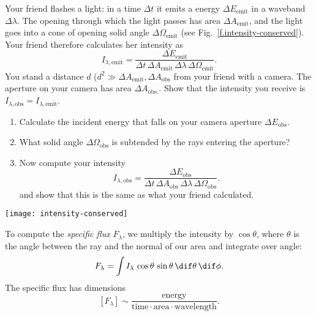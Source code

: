 \begin{exercisebox}
\label{ex.intensity-conserved}
Your friend flashes a light: in a time $\Delta t$ it emits a energy $\Delta E_{\mathrm{emit}}$ in a waveband $\Delta\lambda$. The opening through which the light passes has area $\Delta A_{\mathrm{emit}}$, and the light goes into a cone of opening solid angle $\Delta\Omega_{\mathrm{emit}}$ (see Fig.~\ref{f.intensity-conserved}). Your friend therefore calculates her intensity as
\[	
	I_{\lambda,\mathrm{emit}} = \frac{\Delta E_{\mathrm{emit}}}{\Delta t\,\Delta A_{\mathrm{emit}}\,\Delta\lambda \,\Delta\Omega_{\mathrm{emit}}}.
\]
You stand a distance $d$ ($d^{2}\gg \Delta A_{\mathrm{emit}}, \Delta A_{\mathrm{obs}}$ from your friend with a camera. The aperture on your camera has area $\Delta A_{\mathrm{obs.}}$. Show that the intensity you receive is $I_{\lambda,\mathrm{obs}} = I_{\lambda,\mathrm{emit}}$.
\begin{enumerate}
\item Calculate the incident energy that falls on your camera aperture $\Delta E_{\mathrm{obs}}$.
\item What solid angle $\Delta\Omega_{\mathrm{obs}}$ is subtended by the rays entering the aperture?
\item Now compute your intensity
\[	
	I_{\lambda,\mathrm{obs}} = \frac{\Delta E_{\mathrm{obs}}}{\Delta t\,\Delta A_{\mathrm{obs}}\,\Delta\lambda \,\Delta\Omega_{\mathrm{obs}}}.
\]
and show that this is the same as what your friend calculated.
\end{enumerate}
\end{exercisebox}
\begin{figure*}
\texttt{[image: intensity-conserved]}
\caption[Schematic of intensity being constant]{\label{f.intensity-conserved} Schematic for exercise \ref{ex.intensity-conserved}.}
\end{figure*}

To compute the \emph{specific flux} $F_{\lambda}$, we multiply the intensity by $\cos\theta$, where $\theta$ is the angle between the ray and the normal of our area and integrate over angle:
\begin{equation}\label{e.specific-flux}
F_{\lambda} =  \int I_{\lambda}\,\cos\theta\,\sin\theta\,\dif\theta\,\dif\phi.
\end{equation}
The specific flux has dimensions
\[
	[F_{\lambda}] \sim \frac{\textrm{energy}}{\textrm{time}\cdot\textrm{area}\cdot\textrm{wavelength}}.
\]


